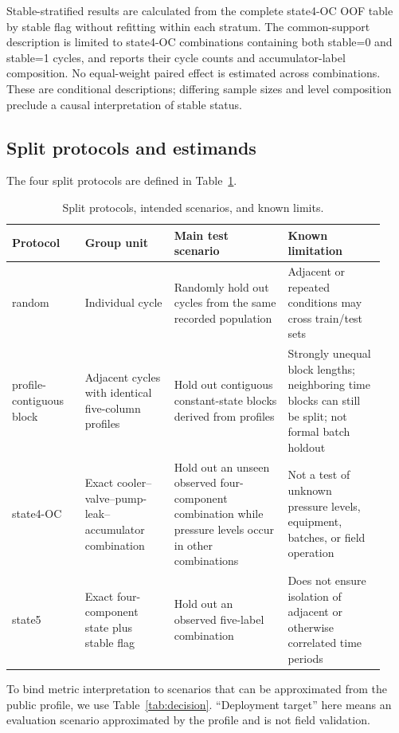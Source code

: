 \documentclass[11pt,a4paper]{article}
\newcommand{\toprule}{\hline}
\newcommand{\midrule}{\hline}
\newcommand{\bottomrule}{\hline}
\begin{document}
Stable-stratified results are calculated from the complete state4-OC OOF table by stable flag without refitting within each stratum. The common-support description is limited to state4-OC combinations containing both stable=0 and stable=1 cycles, and reports their cycle counts and accumulator-label composition. No equal-weight paired effect is estimated across combinations. These are conditional descriptions; differing sample sizes and level composition preclude a causal interpretation of stable status.

\subsection{Split protocols and estimands}

The four split protocols are defined in Table~\ref{tab:protocols}.

\begin{table}[htbp]
\centering\small
\caption{Split protocols, intended scenarios, and known limits.}
\label{tab:protocols}
\begin{tabular}{p{0.18\linewidth}p{0.22\linewidth}p{0.29\linewidth}p{0.24\linewidth}}
\toprule
Protocol & Group unit & Main test scenario & Known limitation\\
\midrule
random & Individual cycle & Randomly hold out cycles from the same recorded population & Adjacent or repeated conditions may cross train/test sets\\
profile-contiguous block & Adjacent cycles with identical five-column profiles & Hold out contiguous constant-state blocks derived from profiles & Strongly unequal block lengths; neighboring time blocks can still be split; not formal batch holdout\\
state4-OC & Exact cooler--valve--pump-leak--accumulator combination & Hold out an unseen observed four-component combination while pressure levels occur in other combinations & Not a test of unknown pressure levels, equipment, batches, or field operation\\
state5 & Exact four-component state plus stable flag & Hold out an observed five-label combination & Does not ensure isolation of adjacent or otherwise correlated time periods\\
\bottomrule
\end{tabular}
\end{table}

To bind metric interpretation to scenarios that can be approximated from the public profile, we use Table~\ref{tab:decision}. ``Deployment target'' here means an evaluation scenario approximated by the profile and is not field validation.
\end{document}
